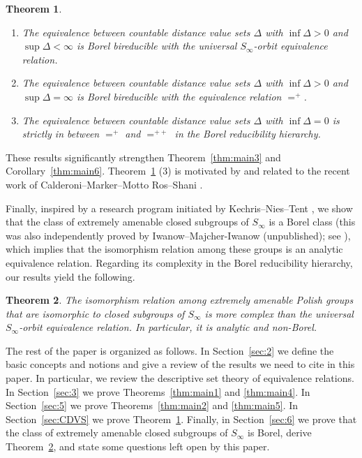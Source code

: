 \documentclass{amsart}
\newtheorem{theorem}{Theorem}[section]
\theoremstyle{definition}
\theoremstyle{remark}
\begin{document}
\begin{theorem}\label{thm:main8}{\ }
\begin{enumerate}
\item[\rm (1)] The equivalence between countable distance value sets $\Delta$ with $\inf\Delta>0$ and $\sup\Delta<\infty$ is Borel bireducible with the universal $S_\infty$-orbit equivalence relation.
\item[\rm (2)] The equivalence between countable distance value sets $\Delta$ with $\inf\Delta>0$ and $\sup\Delta=\infty$ is Borel bireducible with the equivalence relation $=^+$.
\item[\rm (3)] The equivalence between countable distance value sets $\Delta$ with $\inf\Delta=0$ is strictly in between $=^+$ and $=^{++}$ in the Borel reducibility hierarchy.
\end{enumerate}
\end{theorem}

These results significantly strengthen Theorem~\ref{thm:main3} and Corollary~\ref{thm:main6}. Theorem~\ref{thm:main8} (3) is motivated by and related to the recent work of Calderoni--Marker--Motto Ros--Shani \cite{CMMRS}. 

Finally, inspired by a research program initiated by Kechris--Nies--Tent \cite{KNT}, we show that the class of extremely amenable closed subgroups of $S_\infty$ is a Borel class (this was also independently proved by Iwanow--Majcher-Iwanow (unpublished); see \cite[Section 3]{Nies}), which implies that the isomorphism relation among these groups is an analytic equivalence relation. Regarding its complexity in the Borel reducibility hierarchy, our results yield the following.

\begin{theorem}\label{thm:main7}  The isomorphism relation among extremely amenable Polish groups that are isomorphic to closed subgroups of $S_\infty$ is more complex than the universal $S_\infty$-orbit equivalence relation. In particular, it is analytic and non-Borel.
\end{theorem}



The rest of the paper is organized as follows. In Section~\ref{sec:2} we define the basic concepts and notions and give a review of the results we need to cite in this paper. In particular, we review the descriptive set theory of equivalence relations. In Section~\ref{sec:3} we prove Theorems~\ref{thm:main1} and \ref{thm:main4}. In Section~\ref{sec:5} we prove Theorems~\ref{thm:main2} and \ref{thm:main5}. In Section~\ref{sec:CDVS} we prove Theorem~\ref{thm:main8}. Finally, in Section~\ref{sec:6} we prove that the class of extremely amenable closed subgroups of $S_\infty$ is Borel, derive Theorem~\ref{thm:main7}, and state some questions left open by this paper.
\end{document}
